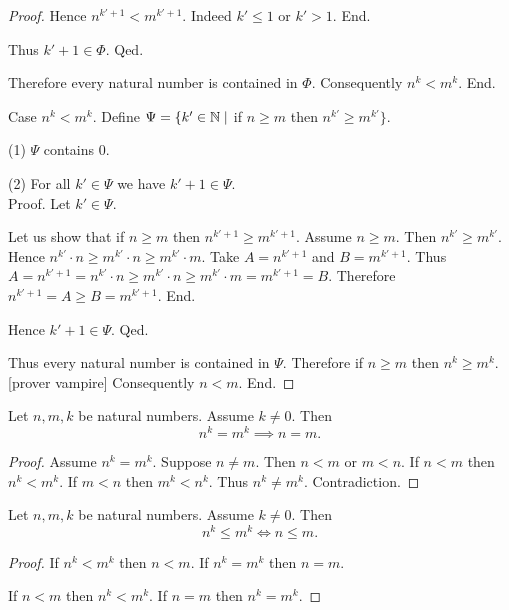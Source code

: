 \documentclass[../arithmetic.tex]{subfiles}
\begin{document}
\begin{forthel}
\begin{proof}
            Hence $n^{k' + 1} < m^{k' + 1}$.
            Indeed $k' \leq 1$ or $k' > 1$.
          End.

          Thus $k' + 1 \in \Phi$.
        Qed.

        Therefore every natural number is contained in $\Phi$.
        Consequently $n^{k} < m^{k}$.
      End.

      Case $n^{k} < m^{k}$.
        Define $\Psi = \{ k' \in \mathbb{N} \mid$ if $n \geq m$ then
        $n^{k'} \geq m^{k'} \}$.

        (1) $\Psi$ contains $0$.

        (2) For all $k' \in \Psi$ we have $k' + 1 \in \Psi$. \\
        Proof.
          Let $k' \in \Psi$.

          Let us show that if $n \geq m$ then $n^{k' + 1} \geq m^{k' + 1}$.
            Assume $n \geq m$.
            Then $n^{k'} \geq m^{k'}$.
            Hence $n^{k'} \cdot n \geq m^{k'} \cdot n \geq m^{k'} \cdot m$.
            Take $A = n^{k' + 1}$ and $B = m^{k' + 1}$. %
            Thus $A
              = n^{k' + 1}
              = n^{k'} \cdot n
              \geq m^{k'} \cdot n
              \geq m^{k'} \cdot m
              = m^{k' + 1}
              = B$.
            Therefore $n^{k' + 1} = A \geq B = m^{k' + 1}$.
          End.

          Hence $k' + 1 \in \Psi$.
        Qed.

        Thus every natural number is contained in $\Psi$.
        Therefore if $n \geq m$ then $n^{k} \geq m^{k}$.
        [prover vampire]
        Consequently $n < m$.
      End.
    \end{proof}
  \end{forthel}

  \begin{forthel}
    \begin{corollary}
      Let $n, m, k$ be natural numbers.
      Assume $k \neq 0$.
      Then \[ n^{k} = m^{k} \implies n = m. \]
    \end{corollary}
    \begin{proof}
      Assume $n^{k} = m^{k}$.
      Suppose $n \neq m$.
      Then $n < m$ or $m < n$.
      If $n < m$ then $n^{k} < m^{k}$.
      If $m < n$ then $m^{k} < n^{k}$.
      Thus $n^{k} \neq m^{k}$.
      Contradiction.
    \end{proof}
  \end{forthel}

  \begin{forthel}
    \begin{corollary}
      Let $n, m, k$ be natural numbers.
      Assume $k \neq 0$.
      Then \[ n^{k} \leq m^{k} \iff n \leq m. \]
    \end{corollary}
    \begin{proof}
      If $n^{k} < m^{k}$ then $n < m$.
      If $n^{k} = m^{k}$ then $n = m$.

      If $n < m$ then $n^{k} < m^{k}$.
      If $n = m$ then $n^{k} = m^{k}$.
    \end{proof}
  \end{forthel}
\end{document}
